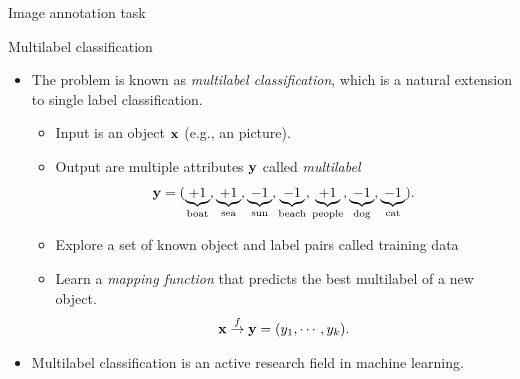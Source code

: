 \documentclass[first=purple,second=dgreen,logo=redexc]{aaltoslides}
\begin{document}
{\begin{frame}{Image annotation task}
{\begin{center}
	\end{center}
	}
\end{frame}


\begin{frame}{Multilabel classification}
	\begin{itemize}
		\item The problem is known as \textit{multilabel classification}, which is a natural extension to single label classification.
		\begin{itemize}
			\footnotesize
			\item Input is an object $\mathbf {x}$ (e.g., an picture).
			\item Output are multiple attributes $\mathbf {y}$ called \textit{multilabel}
			\begin{align*}
\mathbf {y}=(\underbrace{+1}_{\text{boat}},\underbrace{+1}_{\text{sea}},\underbrace{-1}_{\text{sun}},\underbrace{-1}_{\text{beach}},\underbrace{+1}_{\text{people}},\underbrace{-1}_{\text{dog}},\underbrace{-1}_{\text{cat}}).
			\end{align*}
			\item Explore a set of known object and label pairs called {training data} \\
			\item Learn a \textit{mapping function} that predicts the best multilabel of a new object.
			\begin{align*}
				\mathbf {x}\overset{f}{\rightarrow}\mathbf {y}=(y_1,\cdots,y_k).
			\end{align*}
		\end{itemize}
		\item Multilabel classification is an active research field in machine learning.
	\end{itemize}
\end{frame}

}
\end{document}
